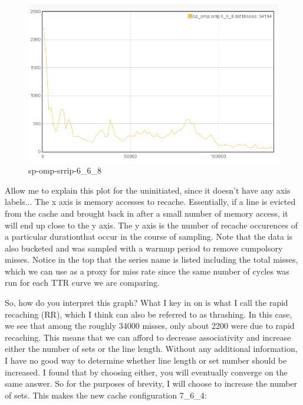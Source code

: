 \begin{figure}
\begin{center}
\includegraphics[width={0.9\columnwidth}]{images/sp_omp-srrip-6_6_8}
\end{center}
\caption{sp-omp-srrip-6\_6\_8}
\label{6_6_8}
\end{figure}

Allow me to explain this plot for the uninitiated, since it doesn't have any axis labels... The x axis is memory accesses to recache. Essentially, if a line is evicted from the cache and brought back in after a small number of memory access, it will end up close to the y axis. The y axis is the number of recache occurences of a particular durationthat occur in the course of sampling. Note that the data is also bucketed and was sampled with a warmup period to remove cumpolsory misses. Notice in the top that the series name is listed including the total misses, which we can use as a proxy for miss rate since the same number of cycles was run for each TTR curve we are comparing.

So, how do you interpret this graph? What I key in on is what I call the rapid recaching (RR), which I think can also be referred to as thrashing. In this case, we see that among the roughly 34000 misses, only about 2200 were due to rapid recaching. This means that we can afford to decrease associativity and increase either the number of sets or the line length. Without any additional information, I have no good way to determine whether line length or set number should be increased. I found that by choosing either, you will eventually converge on the same answer. So for the purposes of brevity, I will choose to increase the number of sets. This makes the new cache configuration 7\_6\_4:

